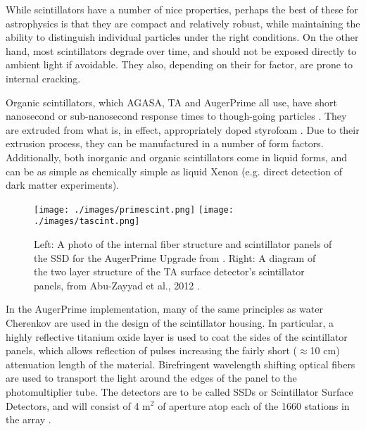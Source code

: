 While scintillators have a number of nice properties, perhaps the best of these for astrophysics is that they are compact and relatively robust, while maintaining the ability to distinguish individual particles under the right conditions. On the other hand, most scintillators degrade over time, and should not be exposed directly to ambient light if avoidable. They also, depending on their for factor, are prone to internal cracking.

Organic scintillators, which AGASA, TA and AugerPrime all use, have short nanosecond or sub-nanosecond response times to though-going particles \cite{augerscint,tadet,scints}. They are extruded from what is, in effect, appropriately doped styrofoam \cite{fermiscint}. Due to their extrusion process, they can be manufactured in a number of form factors. Additionally, both inorganic and organic scintillators come in liquid forms, and can be as simple as chemically simple as liquid Xenon (e.g. direct detection of dark matter experiments).

\begin{figure}[h!]
\begin{center}
\texttt{[image: ./images/primescint.png]}
\texttt{[image: ./images/tascint.png]}
\caption[Auger and TA Scintillators]{Left: A photo of the internal fiber structure and scintillator panels of the SSD for the AugerPrime Upgrade from . Right: A diagram of the two layer structure of the TA surface detector's scintillator panels, from Abu-Zayyad et al., 2012 \cite{tadet}.}
\label{scintdiag}
\end{center}
\end{figure}

In the AugerPrime implementation, many of the same principles as water Cherenkov are used in the design of the scintillator housing. In particular, a highly reflective titanium oxide layer is used to coat the sides of the scintillator panels, which allows reflection of pulses increasing the fairly short ($\approx$10 cm) attenuation length of the material. Birefringent wavelength shifting optical fibers are used to transport the light around the edges of the panel to the photomultiplier tube. The detectors are to be called SSDs or Scintillator Surface Detectors, and will consist of 4 m$^2$ of aperture atop each of the 1660 stations in the array \cite{augerscint}.

